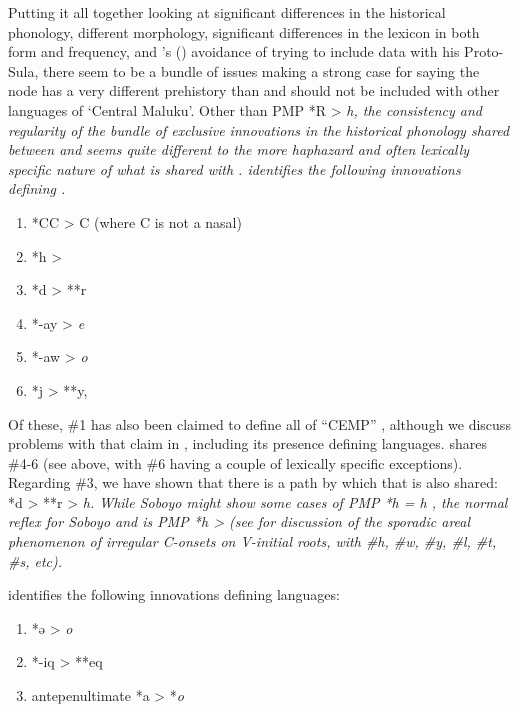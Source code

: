 Putting it all together looking at significant differences in
the historical phonology, different morphology, significant differences in the lexicon
in both form and frequency, and \citeauthor{Bloyd2015}'s (\citeyear{Bloyd2015,Bloyd2020})
avoidance of trying to include
 data with his Proto-Sula,
there seem to be a bundle of issues making a strong case for
saying the  node has a very different prehistory
than  and should not be included with other languages of ‘Central Maluku’.
Other than PMP *R > \it{h},
the consistency and regularity of the bundle of exclusive innovations
in the historical phonology shared between 
and  seems quite different to the more haphazard
and often lexically specific nature of what is shared with .
\citet{Mead2003a} identifies the following innovations defining
. 

\begin{enumerate}[noitemsep]
		\item	*CC\sub{2} > C (where C is not a nasal)
		\item	*h > {\0}
		\item	*d > **r
		\item	*-ay > \it{e}
		\item	*-aw > \it{o}
		\item	*j > **y, {\0}
\end{enumerate}

Of these, {\#}1 has also been claimed to define all of “CEMP”
\citep[246]{Blust1993}, although we discuss problems with that claim in ,
including its presence defining  languages.
 shares {\#}4-6 (see  above,
with {\#}6 having a couple of lexically specific exceptions).
Regarding {\#}3, we have shown that there is a path by which
that is also shared: *d > **r > \it{h}.
While Soboyo might show some cases of PMP *h = \it{h} \citep{Blust1981},
the normal reflex for Soboyo
and  is PMP *h > {\0} (see  for discussion
of the sporadic areal phenomenon of irregular C-onsets on V-initial
roots, with {\#}h, {\#}w, {\#}y, {\#}l, {\#}t, {\#}s, etc).

\citet{Mead2003a,Mead2003b} identifies the following innovations defining
 languages: 

\begin{enumerate}[noitemsep]
	\item	*ə > \it{o}
	\item	*-iq > **eq
	\item	antepenultimate *a > *\it{o}
\end{enumerate}

